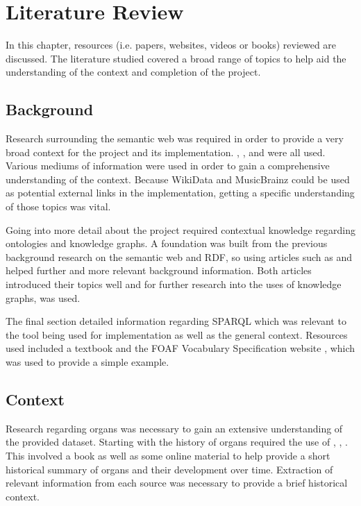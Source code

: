 \chapter{Literature Review}
In this chapter, resources (i.e. papers, websites, videos or books) reviewed are discussed. The literature studied covered a broad range of topics to help aid the understanding of the context and completion of the project.

\section{Background}
\hspace{0.5cm} Research surrounding the semantic web was required in order to provide a very broad context for the project and its implementation. \cite{berners-TBLBook}, \cite{semanticweb}, \cite{rdf} and \cite{TTL} were all used. Various mediums of information were used in order to gain a comprehensive understanding of the context. Because WikiData \cite{wikidata} and MusicBrainz \cite{musicbrainz} could be used as potential external links in the implementation, getting a specific understanding of those topics was vital. 

Going into more detail about the project required contextual knowledge regarding ontologies and knowledge graphs. A foundation was built from the previous background research on the semantic web and RDF, so using articles such as \cite{ontology} and \cite{knowledgegraph} helped further and more relevant background information. Both articles introduced their topics well and for further research into the uses of knowledge graphs, \cite{searchengine} was used.   

The final section detailed information regarding SPARQL which was relevant to the tool being used for implementation as well as the general context. Resources used included a textbook\cite{sparlbook} and the FOAF Vocabulary Specification website \cite{foaf}, which was used to provide a simple example. 

\section{Context}
\hspace{0.5cm} Research regarding organs was necessary to gain an extensive understanding of the provided dataset. Starting with the history of organs required the use of \cite{organhistory}, \cite{organhistory1}, \cite{organmedivalhistory}. This involved a book as well as some online material to help provide a short historical summary of organs and their development over time. Extraction of relevant information from each source was necessary to provide a brief historical context. 

